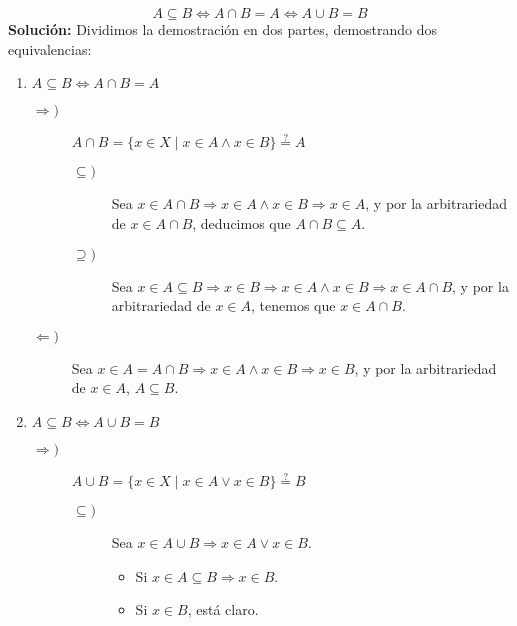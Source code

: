 \begin{ejercicio}
    \begin{equation*}
        A \subseteq B \Longleftrightarrow A \cap B = A \Longleftrightarrow A \cup B = B
    \end{equation*}    
    \textbf{Solución:}
    Dividimos la demostración en dos partes, demostrando dos equivalencias:
    \begin{enumerate}
        \item $A\subseteq B\Longleftrightarrow A\cap B=A$
            \begin{description}
                \item [$\Longrightarrow)$] $A\cap B = \{x\in X\mid x\in A\land x\in B\} \stackrel{\text{?}}{=}A$
                    \begin{description}
                        \item [$\subseteq)$] Sea $x\in A\cap B \Longrightarrow x\in A \land x\in B \Longrightarrow x\in A$, y por la arbitrariedad de $x\in A\cap B$, deducimos que $A\cap B\subseteq A$.
                        \item [$\supseteq)$] Sea $x\in A\subseteq B\Longrightarrow x\in B\Longrightarrow x\in A\land x\in B \Longrightarrow x\in A\cap B$, y por la arbitrariedad de $x\in A$, tenemos que $x\in A\cap B$.
                    \end{description}
                \item [$\Longleftarrow)$] Sea $x\in A=A\cap B\Longrightarrow x\in A\land x\in B \Longrightarrow x\in B$, y por la arbitrariedad de $x\in A$, $A\subseteq B$.
            \end{description}
        \item $A\subseteq B\Longleftrightarrow A\cup B = B$
            \begin{description}
                \item [$\Longrightarrow)$] $A\cup B = \{x\in X\mid x\in A\lor x\in B\} \stackrel{\text{?}}{=}B$
                    \begin{description}
                        \item [$\subseteq)$] 
                            Sea $x\in A\cup B \Longrightarrow x\in A\lor x\in B$.
                            \begin{itemize}
                                \item Si $x\in A \subseteq B\Longrightarrow x\in B$.
                                \item Si $x\in B$, está claro.
                            \end{itemize}

\end{description}
\end{description}
\end{enumerate}
\end{ejercicio}
